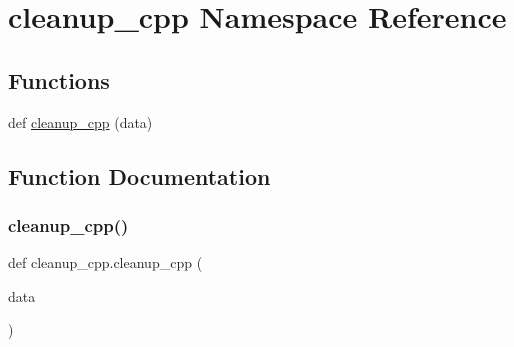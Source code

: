 \hypertarget{namespacecleanup__cpp}{}\section{cleanup\+\_\+cpp Namespace Reference}
\label{namespacecleanup__cpp}
\subsection*{Functions}
\begin{DoxyCompactItemize}
\item 
def \hyperlink{namespacecleanup__cpp_a5ade0922e3c3bd2bb3280b59073207cd}{cleanup\+\_\+cpp} (data)
\end{DoxyCompactItemize}


\subsection{Function Documentation}
\mbox{\label{namespacecleanup__cpp_a5ade0922e3c3bd2bb3280b59073207cd}} 
\subsubsection{\texorpdfstring{cleanup\+\_\+cpp()}{cleanup\_cpp()}}
{\footnotesize\ttfamily def cleanup\+\_\+cpp.\+cleanup\+\_\+cpp (\begin{DoxyParamCaption}\item[{}]{data }\end{DoxyParamCaption})}

